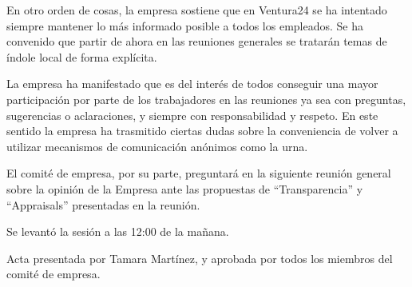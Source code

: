 \documentclass[11pt]{article}
\begin{document}
En otro orden de cosas, la empresa sostiene que en Ventura24 se ha intentado siempre mantener lo más informado posible a todos los empleados. Se ha convenido que partir de ahora en las reuniones generales se tratarán temas de índole local de forma explícita.

La empresa ha manifestado que es del interés de todos conseguir una mayor participación por parte de los trabajadores en las reuniones ya sea con preguntas, sugerencias o aclaraciones, y siempre con responsabilidad y respeto. En este sentido la empresa ha trasmitido ciertas dudas sobre la conveniencia de volver a utilizar mecanismos de comunicación anónimos como la urna.

El comité de empresa, por su parte, preguntará en la siguiente reunión general sobre la opinión de la Empresa ante las propuestas de “Transparencia” y “Appraisals” presentadas en la reunión.

Se levantó la sesión a las 12:00 de la mañana.


Acta presentada por Tamara Martínez, y aprobada por todos los miembros del comité de empresa.
\end{document}
